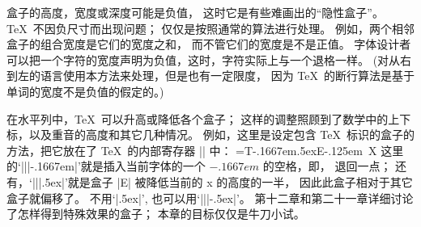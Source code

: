 \danger 盒子的高度，宽度或深度可能是负值，
这时它是有些难画出的``隐性盒子''。%
\TeX\ 不因负尺寸而出现问题；
仅仅是按照通常的算法进行处理。%
例如，两个相邻盒子的组合宽度是它们的宽度之和，
而不管它们的宽度是不是正值。%
字体设计者可以把一个字符的宽度声明为负值，这时，字符实际上与一个退格一样。%
(对从右到左的语言使用本方法来处理，但是也有一定限度，
因为 \TeX\ 的断行算法是基于单词的宽度不是负值的假定的。)

\danger 在水平列中，\TeX\ 可以升高或降低各个盒子；
这样的调整照顾到了数学中的上下标，以及重音的高度和其它几种情况。%
例如，这里是设定包含 \TeX\ 标识的盒子的方法，把它放在了 \TeX\ 的内部寄存器 || 中：
\begintt
{}=\hbox{T\kern-.1667em\lower.5ex\hbox{E}\kern-.125em X}
\endtt
这里的`|\kern||-.1667em|'就是插入当前字体的一个 $-.1667em$ 的空格，即，
退回一点；
还有，`|\lower||.5ex|'就是盒子 |\hbox{E}| 被降低当前的 x 的高度的一半，
因此此盒子相对于其它盒子就偏移了。%
不用`|\lower.5ex|', 也可以用`|\raise||-.5ex|'。%
第十二章和第二十一章详细讨论了怎样得到特殊效果的盒子；
本章的目标仅仅是牛刀小试。

